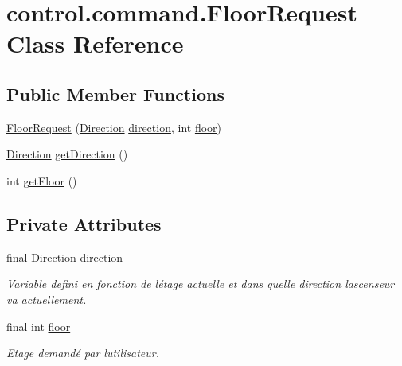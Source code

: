 \hypertarget{classcontrol_1_1command_1_1_floor_request}{}\section{control.\+command.\+Floor\+Request Class Reference}
\label{classcontrol_1_1command_1_1_floor_request}
\subsection*{Public Member Functions}
\begin{DoxyCompactItemize}
\item 
\mbox{\hyperlink{classcontrol_1_1command_1_1_floor_request_a03685a59d9f54c5057713039fa580369}{Floor\+Request}} (\mbox{\hyperlink{enumcontrol_1_1command_1_1_direction}{Direction}} \mbox{\hyperlink{classcontrol_1_1command_1_1_floor_request_a0d1e1a3a816acba02789469f4e46a5d1}{direction}}, int \mbox{\hyperlink{classcontrol_1_1command_1_1_floor_request_a8cac00f900db9272c0e6971e0327075f}{floor}})
\item 
\mbox{\hyperlink{enumcontrol_1_1command_1_1_direction}{Direction}} \mbox{\hyperlink{classcontrol_1_1command_1_1_floor_request_ad0e7950407e9e15e4a3be8927f1e3408}{get\+Direction}} ()
\item 
int \mbox{\hyperlink{classcontrol_1_1command_1_1_floor_request_a752d0cf165ba8d1033b9d8ca6b4c4d3e}{get\+Floor}} ()
\end{DoxyCompactItemize}
\subsection*{Private Attributes}
\begin{DoxyCompactItemize}
\item 
final \mbox{\hyperlink{enumcontrol_1_1command_1_1_direction}{Direction}} \mbox{\hyperlink{classcontrol_1_1command_1_1_floor_request_a0d1e1a3a816acba02789469f4e46a5d1}{direction}}
\begin{DoxyCompactList}\small\item\em Variable defini en fonction de l\textquotesingle{}étage actuelle et dans quelle direction l\textquotesingle{}ascenseur va actuellement. \end{DoxyCompactList}\item 
final int \mbox{\hyperlink{classcontrol_1_1command_1_1_floor_request_a8cac00f900db9272c0e6971e0327075f}{floor}}
\begin{DoxyCompactList}\small\item\em Etage demandé par l\textquotesingle{}utilisateur. \end{DoxyCompactList}\end{DoxyCompactItemize}


